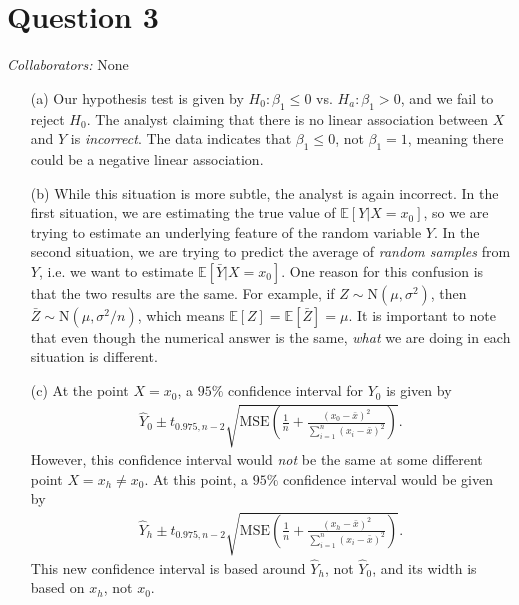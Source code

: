 \documentclass[10pt]{article}
\newcommand{\mycolaba}[1]{\textcolor{colabcol}{\textsl{Collaborators:}} #1}
\begin{document}
\section{Question 3} \noindent
\mycolaba{None}
\begin{itemize}
    \item[(a)] Our hypothesis test is given by \(H_0:\beta_1 \le 0\) vs. \(H_a:\beta_1 > 0\), and we fail to reject \(H_0\). The analyst claiming that 
    there is no linear association between \(X\) and \(Y\) is \textsl{incorrect}. The data indicates that \(\beta_1 \le 0\), not \(\beta_1 = 1\), meaning
    there could be a negative linear association. 
    \item[(b)] While this situation is more subtle, the analyst is again incorrect. In the first situation, we are estimating the true value of 
    \(\mathbb{E}[Y|X=x_0]\), so we are trying to estimate an underlying feature of the random variable \(Y\). In the second situation, we are trying 
    to predict the average of \textsl{random samples} from \(Y\), i.e. we want to estimate \(\mathbb{E}[\bar{Y}|X=x_0]\). One reason for this confusion is that
    the two results are the same. For example, if \(Z \sim \mathrm{N}(\mu, \sigma^2)\), then \(\bar{Z}\sim\mathrm{N}(\mu,\sigma^2/n)\), which means 
    \(\mathbb{E}[Z] = \mathbb{E}[\bar{Z}] = \mu\). It is important to note that even though the numerical answer is the same, \textsl{what} we are doing in
    each situation is different.
    \item[(c)] At the point \(X = x_0\), a \(95\%{}\) confidence interval for \(Y_0\) is given by 
    \begin{align*}
        \hat{Y}_0 \pm t_{0.975,n-2} \sqrt{\mathrm{MSE} \left( \frac{1}{n} + \frac{(x_0 - \bar{x})^2}{\sum_{i=1}^n(x_i - \bar{x})^2} \right)}.
    \end{align*}
    However, this confidence interval would \textsl{not} be the same at some different point \(X = x_h \neq x_0\). At this point, a \(95\%{}\)
    confidence interval would be given by 
    \begin{align*}
        \hat{Y}_h \pm t_{0.975,n-2} \sqrt{\mathrm{MSE} \left( \frac{1}{n} + \frac{(x_h - \bar{x})^2}{\sum_{i=1}^n(x_i - \bar{x})^2} \right)}.
    \end{align*}
    This new confidence interval is based around \(\hat{Y}_h\), not \(\hat{Y}_0\), and its width is based on \(x_h\), not \(x_0\).
\end{itemize}

\end{document}
